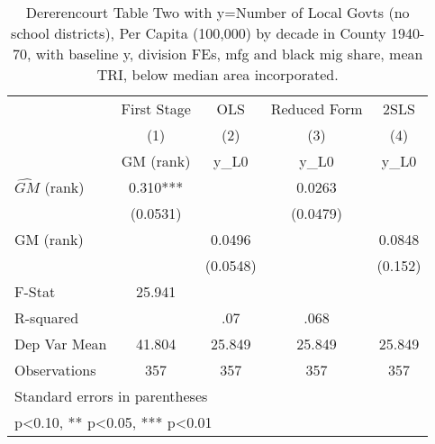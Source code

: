 \begin{table}[htbp]\centering
\def\sym#1{\ifmmode^{#1}\else\(^{#1}\)\fi}
\caption{Dererencourt Table Two with y=Number of Local Govts (no school districts), Per Capita (100,000) by decade in County 1940-70, with baseline y, division FEs, mfg and black mig share, mean TRI, below median area incorporated.}
\begin{tabular}{l*{4}{c}}
\toprule
                    & First Stage   &         OLS   &Reduced Form   &        2SLS   \\
                    &\multicolumn{1}{c}{(1)}&\multicolumn{1}{c}{(2)}&\multicolumn{1}{c}{(3)}&\multicolumn{1}{c}{(4)}\\
                    &\multicolumn{1}{c}{GM  (rank)}&\multicolumn{1}{c}{y\_L0}&\multicolumn{1}{c}{y\_L0}&\multicolumn{1}{c}{y\_L0}\\
\midrule
$\hat{GM}$ (rank)   &       0.310***&               &      0.0263   &               \\
                    &    (0.0531)   &               &    (0.0479)   &               \\
\addlinespace
GM  (rank)          &               &      0.0496   &               &      0.0848   \\
                    &               &    (0.0548)   &               &     (0.152)   \\
\midrule
F-Stat              &      25.941   &               &               &               \\
R-squared           &               &         .07   &        .068   &               \\
Dep Var Mean        &      41.804   &      25.849   &      25.849   &      25.849   \\
Observations        &         357   &         357   &         357   &         357   \\
\bottomrule
\multicolumn{5}{l}{\footnotesize Standard errors in parentheses}\\
\multicolumn{5}{l}{\footnotesize * p<0.10, ** p<0.05, *** p<0.01}\\
\end{tabular}
\end{table}
